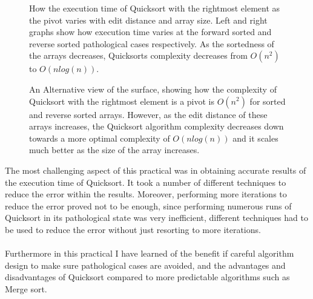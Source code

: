 \documentclass{article}
\begin{document}
\begin{landscape}
\begin{figure}[H]
\centering
\begin{subfigure}{0.72\textwidth}
\centering
{}
\end{subfigure}
\begin{subfigure}{0.72\textwidth}
\centering
{}
\end{subfigure}
\caption{How the execution time of Quicksort with the rightmost element as the pivot varies with edit distance and array size. Left and right graphs show how execution time varies at the forward sorted and reverse sorted pathological cases respectively. As the sortedness of the arrays decreases, Quicksorts complexity decreases from $O(n^2)$ to $O(nlog(n))$.}
\label{fig:sortedness_vs_time_vs_size}
\end{figure}
\end{landscape}
\restoregeometry

\begin{landscape}
\begin{figure}[H]
\centering
\begin{subfigure}{0.72\textwidth}
\centering
{}
\end{subfigure}
\begin{subfigure}{0.72\textwidth}
\centering
{}
\end{subfigure}
\caption{An Alternative view of the surface, showing how the complexity of Quicksort with the rightmost element is a pivot is $O(n^2)$ for sorted and reverse sorted arrays. However, as the edit distance of these arrays increases, the Quicksort algorithm complexity decreases down towards a more optimal complexity of $O(nlog(n))$ and it scales much better as the size of the array increases.}
\label{fig:sortedness_vs_time_vs_size}
\end{figure}
\end{landscape}
\restoregeometry

\noindent The most challenging aspect of this practical was in obtaining accurate results of the execution time of Quicksort. It took a number of different techniques to reduce the error within the results. Moreover, performing more iterations to reduce the error proved not to be enough, since performing numerous runs of Quicksort in its pathological state was very inefficient, different techniques had to be used to reduce the error without just resorting to more iterations. \\ \\ \noindent Furthermore in this practical I have learned of the benefit if careful algorithm design to make sure pathological cases are avoided, and the advantages and disadvantages of Quicksort compared to more predictable algorithms such as Merge sort.
\end{document}
